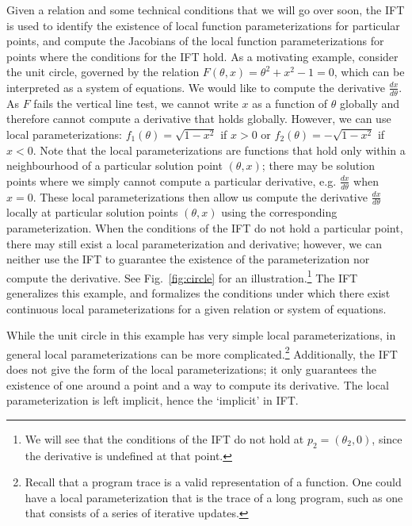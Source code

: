\documentclass[11pt]{article}
\begin{document}
Given a relation and some technical conditions that we will go over soon,
the IFT is used to identify the existence of local
function parameterizations for particular points,
and compute the Jacobians of the local function parameterizations for points
where the conditions for the IFT hold.
As a motivating example, consider the unit circle,
governed by the relation $F(\theta,x) = \theta^2 + x^2 - 1 = 0$,
which can be interpreted as a system of equations.
We would like to compute the derivative $\frac{dx}{d\theta}$.
As $F$ fails the vertical line test, we cannot write $x$ as a function of $\theta$ globally
and therefore cannot compute a derivative that holds globally.
However, we can use local parameterizations: $f_1(\theta) = \sqrt{1-x^2}$ if $x > 0$
or $f_2(\theta) = -\sqrt{1-x^2}$ if $x<0$.
Note that the local parameterizations are functions that hold
only within a neighbourhood of a particular solution point $(\theta,x)$;
there may be solution points where we simply cannot compute a particular derivative,
e.g. $\frac{dx}{d\theta}$ when $x=0$.
These local parameterizations then allow us compute the derivative $\frac{dx}{d\theta}$
locally at particular solution points $(\theta,x)$ using the corresponding parameterization.
When the conditions of the IFT do not hold a particular point,
there may still exist a local parameterization and derivative;
however, we can neither use the IFT to guarantee the existence of the parameterization
nor compute the derivative.
See Fig.~\ref{fig:circle} for an illustration.\footnote{
    We will see that the conditions of the IFT do not hold at $p_2 = (\theta_2, 0)$,
    since the derivative is undefined at that point.
}
The IFT generalizes this example, and formalizes the conditions under which there exist
continuous local parameterizations for a given relation or system of equations.

While the unit circle in this example has very simple local parameterizations,
in general local parameterizations can be more complicated.\footnote{
Recall that a program trace is a valid representation of a function.
One could have a local parameterization that is the trace of a long program,
such as one that consists of a series of iterative updates.
}
Additionally, the IFT does not give the form of the local parameterizations;
it only guarantees the existence of one around a point and a way to compute its derivative.
The local parameterization is left implicit, hence the `implicit' in IFT.
\end{document}
